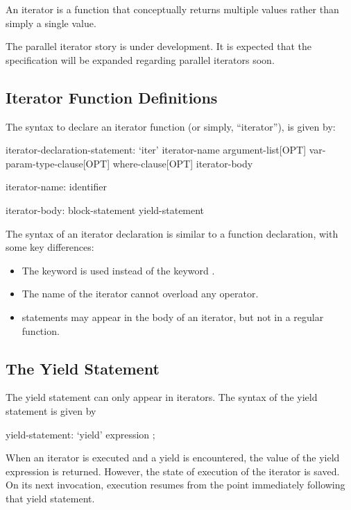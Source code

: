 \label{Iterators}

An iterator is a function that conceptually returns multiple values
rather than simply a single value.

\begin{openissue}
The parallel iterator story is under development.  It is expected that
the specification will be expanded regarding parallel iterators soon.
\end{openissue}

\subsection{Iterator Function Definitions}
\label{Iterator_Function_Definitions}

The syntax to declare an iterator function (or simply, ``iterator''), is given
by:
\begin{syntax}
iterator-declaration-statement:
  `iter' iterator-name argument-list[OPT] var-param-type-clause[OPT] where-clause[OPT]
  iterator-body

iterator-name:
  identifier

iterator-body:
  block-statement
  yield-statement
\end{syntax}

The syntax of an iterator declaration is similar to a function declaration, with
some key differences:
\begin{itemize}
\item The keyword  is used instead of the keyword .
\item The name of the iterator cannot overload any operator.
\item {} statements may appear in the body of an iterator, but not in
a regular function.
\end{itemize}

\subsection{The Yield Statement}
\label{The_Yield_Statement}

The yield statement can only appear in iterators.  The syntax of the
yield statement is given by
\begin{syntax}
yield-statement:
  `yield' expression ;
\end{syntax}

When an iterator is executed and a yield is encountered, the value of the yield
expression is returned.  However, the state of execution of the iterator is
saved.  On its next invocation, execution resumes from the point immediately
following that yield statement.

